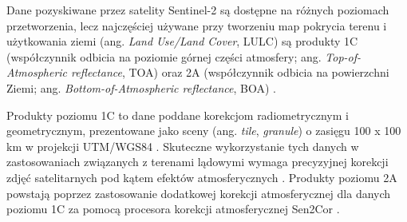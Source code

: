 \documentclass{amuthesis}
\begin{document}
Dane pozyskiwane przez satelity Sentinel-2 są dostępne na różnych
poziomach przetworzenia, lecz najczęściej używane przy tworzeniu map
pokrycia terenu i użytkowania ziemi (ang. \emph{Land Use/Land Cover},
LULC) są produkty 1C (współczynnik odbicia na poziomie górnej części
atmosfery; ang. \emph{Top-of-Atmospheric reflectance}, TOA) oraz 2A
(współczynnik odbicia na powierzchni Ziemi; ang.
\emph{Bottom-of-Atmospheric reflectance}, BOA)
\autocite{phiri_2020_sentinel2}.

Produkty poziomu 1C to dane poddane korekcjom radiometrycznym i
geometrycznym, prezentowane jako sceny (ang. \emph{tile},
\emph{granule}) o zasięgu 100 x 100 km w projekcji UTM/WGS84
\autocite{esa_2015_sentinel2handbook}. Skuteczne wykorzystanie tych
danych w zastosowaniach związanych z terenami lądowymi wymaga
precyzyjnej korekcji zdjęć satelitarnych pod kątem efektów
atmosferycznych \autocite{main-knorn_2017_Sen2Cor}. Produkty poziomu 2A
powstają poprzez zastosowanie dodatkowej korekcji atmosferycznej dla
danych poziomu 1C za pomocą procesora korekcji atmosferycznej Sen2Cor
\autocite{main-knorn_2017_Sen2Cor}.
\end{document}
